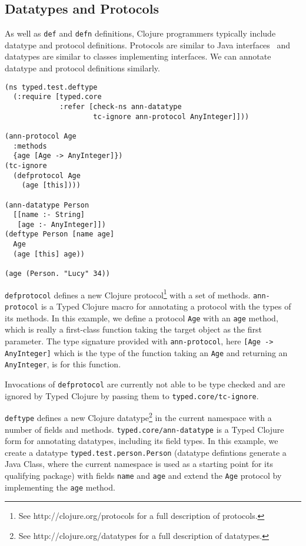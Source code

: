 \subsection{Datatypes and Protocols}
\label{sec:datatypes}

As well as \lstinline|def| and \lstinline|defn| definitions,
Clojure programmers typically include datatype and protocol
definitions. 
Protocols are similar to Java interfaces~\cite{InterfaceTutorial} and datatypes are similar to classes implementing interfaces.
We can annotate datatype and protocol definitions similarly.

\begin{lstlisting}[caption=Annotating protocols and datatypes in Typed Clojure]
(ns typed.test.deftype
  (:require [typed.core 
             :refer [check-ns ann-datatype
                     tc-ignore ann-protocol AnyInteger]]))

(ann-protocol Age 
  :methods
  {age [Age -> AnyInteger]})
(tc-ignore
  (defprotocol Age
    (age [this])))

(ann-datatype Person 
  [[name :- String]
   [age :- AnyInteger]])
(deftype Person [name age]
  Age
  (age [this] age))

(age (Person. "Lucy" 34))
\end{lstlisting}

\lstinline|defprotocol| defines a new Clojure protocol\footnote{See http://clojure.org/protocols for a full description of protocols.}
with a set of methods. \lstinline|ann-protocol| is a Typed Clojure macro for annotating 
a protocol with the types of its methods.
In this example, we define a protocol \lstinline|Age| with an \lstinline|age| method,
which is really a first-class function taking the target object as the first parameter. The
type signature provided with \lstinline|ann-protocol|, here \lstinline|[Age -> AnyInteger]|
which is the type of the function taking an \lstinline|Age| and returning an \lstinline|AnyInteger|,
is for this function.

Invocations of \lstinline|defprotocol| are currently not able to be type checked
and are ignored by Typed Clojure by passing them to \lstinline|typed.core/tc-ignore|.

\lstinline|deftype|
defines a new Clojure datatype\footnote{See http://clojure.org/datatypes for a full description of datatypes.}
in the current namespace with a number of fields and methods. 
\lstinline|typed.core/ann-datatype| is a Typed Clojure form for annotating datatypes, including its field types.
In this example, we create a datatype \lstinline|typed.test.person.Person|
(datatype defintions generate a Java Class, where the current namespace is used as a starting point for its
qualifying package)
with fields \lstinline|name| and \lstinline|age| and 
extend the \lstinline|Age| protocol by implementing the \lstinline|age| method.

